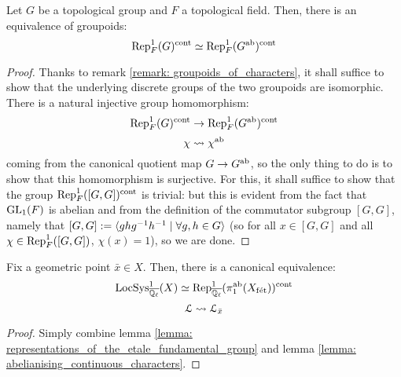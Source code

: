         \begin{lemma} \label{lemma: abelianising_continuous_characters}
            Let $G$ be a topological group and $F$ a topological field. Then, there is an equivalence of groupoids:
                $$\mathrm{Rep}^1_F(G)^{\mathrm{cont}} \simeq \mathrm{Rep}^1_F(G^{\mathrm{ab}})^{\mathrm{cont}}$$
        \end{lemma}
            \begin{proof}
                Thanks to remark \ref{remark: groupoids_of_characters}, it shall suffice to show that the underlying discrete groups of the two groupoids are isomorphic. There is a natural injective group homomorphism:
                    $$\mathrm{Rep}^1_F(G)^{\mathrm{cont}} \to \mathrm{Rep}^1_F(G^{\mathrm{ab}})^{\mathrm{cont}}$$
                    $$\chi \leadsto \chi^{\mathrm{ab}}$$
                coming from the canonical quotient map $G \to G^{\mathrm{ab}}$, so the only thing to do is to show that this homomorphism is surjective. For this, it shall suffice to show that the group $\mathrm{Rep}^1_F([G, G])^{\mathrm{cont}}$ is trivial: but this is evident from the fact that $\operatorname{GL}_1(F)$ is abelian and from the definition of the commutator subgroup $[G, G]$, namely that $[G, G] := \langle ghg^{-1}h^{-1} \mid \forall g, h \in G\rangle$ (so for all $x \in [G, G]$ and all $\chi \in \mathrm{Rep}^1_F([G, G])$, $\chi(x) = 1$), so we are done.
            \end{proof}
        \begin{theorem} \label{theorem: unramified_representations_are_sheaves_on_X}
            Fix a geometric point $\bar{x} \in X$. Then, there is a canonical equivalence:
                $$\mathrm{LocSys}^1_{\overline{\mathbb{Q}_{\ell}}}(X) \simeq \mathrm{Rep}^1_{\overline{\mathbb{Q}_{\ell}}}(\pi_1^{\mathrm{ab}}(X_{\mathrm{f\acute{e}t}}))^{\mathrm{cont}}$$
                $$\mathcal{L} \leadsto \mathcal{L}_{\bar{x}}$$
        \end{theorem}
            \begin{proof}
                Simply combine lemma \ref{lemma: representations_of_the_etale_fundamental_group} and lemma \ref{lemma: abelianising_continuous_characters}.
            \end{proof}